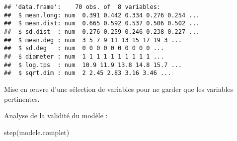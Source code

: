 \documentclass[
]{article}
\newenvironment{Shaded}{\begin{snugshade}}{\end{snugshade}}
\newcommand{\AttributeTok}[1]{\textcolor[rgb]{0.77,0.63,0.00}{#1}}
\newcommand{\CommentTok}[1]{\textcolor[rgb]{0.56,0.35,0.01}{\textit{#1}}}
\newcommand{\FunctionTok}[1]{\textcolor[rgb]{0.00,0.00,0.00}{#1}}
\newcommand{\NormalTok}[1]{#1}
\newcommand{\OtherTok}[1]{\textcolor[rgb]{0.56,0.35,0.01}{#1}}
\newcommand{\SpecialCharTok}[1]{\textcolor[rgb]{0.00,0.00,0.00}{#1}}
\begin{document}
\begin{Shaded}
\end{Shaded}

\begin{verbatim}
## 'data.frame':    70 obs. of  8 variables:
##  $ mean.long: num  0.391 0.442 0.334 0.276 0.254 ...
##  $ mean.dist: num  0.665 0.592 0.537 0.506 0.502 ...
##  $ sd.dist  : num  0.276 0.259 0.246 0.238 0.227 ...
##  $ mean.deg : num  3 5 7 9 11 13 15 17 19 3 ...
##  $ sd.deg   : num  0 0 0 0 0 0 0 0 0 0 ...
##  $ diameter : num  1 1 1 1 1 1 1 1 1 1 ...
##  $ log.tps  : num  10.9 11.9 13.8 14.8 15.7 ...
##  $ sqrt.dim : num  2 2.45 2.83 3.16 3.46 ...
\end{verbatim}

\begin{Shaded}
\end{Shaded}

Mise en \oe uvre d'une sélection de variables pour ne garder que les
variables pertinentes.

Analyse de la validité du modèle :

\begin{Shaded}
\begin{Highlighting}[]
\FunctionTok{step}\NormalTok{(modele.complet)}
\end{Highlighting}
\end{Shaded}
\end{document}
